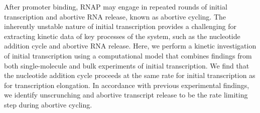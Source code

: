 After promoter binding, RNAP may engage in repeated rounds of initial
transcription and abortive RNA release, known as abortive cycling. The
inherently unstable nature of initial transcription provides a challenging for
extracting kinetic data of key processes of the system, such as the nucleotide
addition cycle and abortive RNA release. Here, we perform a kinetic
investigation of initial transcription using a computational model that
combines findings from both single-molecule and bulk experiments of initial
transcription. We find that the nucleotide addition cycle proceeds at the same
rate for initial transcription as for transcription elongation. In accordance
with previous experimental findings, we identify unscrunching and abortive
transcript release to be the rate limiting step during abortive cycling.
